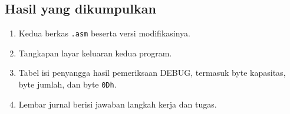 \subsection{Hasil yang dikumpulkan}

\begin{enumerate}
    \item Kedua berkas \texttt{.asm} beserta versi modifikasinya.
    \item Tangkapan layar keluaran kedua program.
    \item Tabel isi penyangga hasil pemeriksaan DEBUG, termasuk byte
          kapasitas, byte jumlah, dan byte \texttt{0Dh}.
    \item Lembar jurnal berisi jawaban langkah kerja dan tugas.
\end{enumerate}
